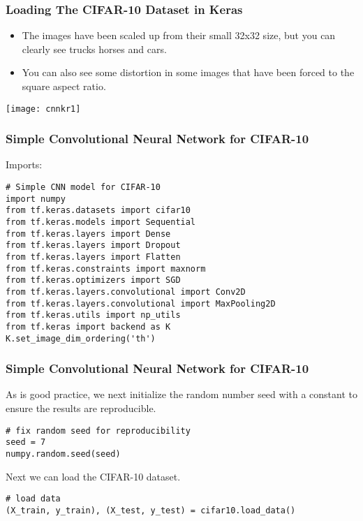 \begin{frame}[fragile] \frametitle{Loading The CIFAR-10 Dataset in Keras}
\begin{itemize}
\item The images have been scaled up from their small 32x32 size, but you can clearly see trucks horses and cars.
\item You can also see some distortion in some images that have been forced to the square aspect ratio.
\end{itemize}
\begin{center}
\texttt{[image: cnnkr1]}
\end{center}
\end{frame}



\begin{frame}[fragile] \frametitle{Simple Convolutional Neural Network for CIFAR-10}
Imports:
\begin{lstlisting}
# Simple CNN model for CIFAR-10
import numpy
from tf.keras.datasets import cifar10
from tf.keras.models import Sequential
from tf.keras.layers import Dense
from tf.keras.layers import Dropout
from tf.keras.layers import Flatten
from tf.keras.constraints import maxnorm
from tf.keras.optimizers import SGD
from tf.keras.layers.convolutional import Conv2D
from tf.keras.layers.convolutional import MaxPooling2D
from tf.keras.utils import np_utils
from tf.keras import backend as K
K.set_image_dim_ordering('th')
\end{lstlisting}

\end{frame}

\begin{frame}[fragile] \frametitle{Simple Convolutional Neural Network for CIFAR-10}
As is good practice, we next initialize the random number seed with a constant to ensure the results are reproducible.
\begin{lstlisting}
# fix random seed for reproducibility
seed = 7
numpy.random.seed(seed)
\end{lstlisting}
Next we can load the CIFAR-10 dataset.
\begin{lstlisting}
# load data
(X_train, y_train), (X_test, y_test) = cifar10.load_data()
\end{lstlisting}
\end{frame}

